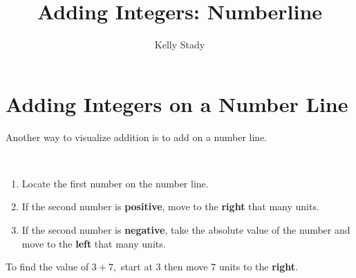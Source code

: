 \documentclass{ximera}[font=12pt]
\title{Adding Integers: Numberline}    %
\author{Kelly Stady}
\begin{document}
\begin{abstract}

\end{abstract}

\maketitle
\label{xim:AddIntNumLActivity}


\section*{Adding Integers on a Number Line}

Another way to visualize addition is to add on a number line.  

\begin{procedure}

    ~ \\[0.5em] %

\begin{enumerate}
\item Locate the first number on the number line.

\item If the second number is \textbf{positive}, move to the \textbf{right} that many units.

\item If the second number is \textbf{negative}, take the absolute value of the number and move to the \textbf{left} that many units.
\end{enumerate}
\end{procedure}


\begin{example}
To find the value of $3+7,$ start at $3$ then move 7 units to the \textbf{right}.  

~ \\[3em]  %
\end{example}
\end{document}
